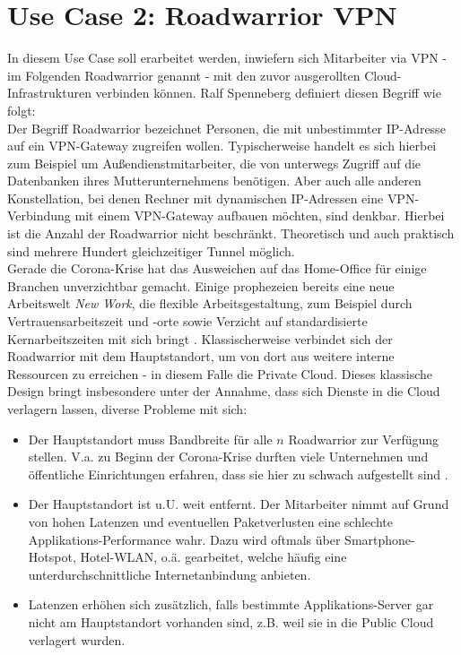 \section{Use Case 2: Roadwarrior VPN}
In diesem Use Case soll erarbeitet werden, inwiefern sich Mitarbeiter via \gls{VPN} - im Folgenden \gls{Roadwarrior} genannt - mit den zuvor ausgerollten Cloud-Infrastrukturen verbinden können. Ralf Spenneberg definiert diesen Begriff wie folgt:\\
\glqq Der Begriff \gls{Roadwarrior} bezeichnet Personen, die mit unbestimmter IP-Adresse auf ein \gls{VPN-Gateway} zugreifen wollen. Typischerweise handelt es sich hierbei zum Beispiel um Außendienstmitarbeiter, die von unterwegs Zugriff auf die Datenbanken ihres Mutterunternehmens benötigen. Aber auch alle anderen Konstellation, bei denen Rechner mit dynamischen IP-Adressen eine \gls{VPN}-Verbindung mit einem \gls{VPN-Gateway} aufbauen möchten, sind denkbar. Hierbei ist die Anzahl der \gls{Roadwarrior} nicht beschränkt. Theoretisch und auch praktisch sind mehrere Hundert gleichzeitiger Tunnel möglich.\grqq{} \cite[S. 199]{Spenneberg2010}\\
Gerade die Corona-Krise hat das Ausweichen auf das Home-Office für einige Branchen unverzichtbar gemacht. Einige prophezeien bereits eine neue Arbeitswelt \textit{New Work}, die \glqq flexible Arbeitsgestaltung, zum Beispiel durch Vertrauensarbeitszeit und -orte sowie Verzicht auf standardisierte Kernarbeitszeiten\grqq{} mit sich bringt \cite{Umbs2020}.
Klassischerweise verbindet sich der \gls{Roadwarrior} mit dem Hauptstandort, um von dort aus weitere interne Ressourcen zu erreichen - in diesem Falle die Private Cloud. Dieses klassische Design bringt insbesondere unter der Annahme, dass sich Dienste in die Cloud verlagern lassen, diverse Probleme mit sich:
\begin{itemize}
\item Der Hauptstandort muss Bandbreite für alle $n$ \gls{Roadwarrior} zur Verfügung stellen. V.a. zu Beginn der Corona-Krise durften viele Unternehmen und öffentliche Einrichtungen erfahren, dass sie hier zu schwach aufgestellt sind \cite{tufreiberg2021}.
\item Der Hauptstandort ist u.U. weit entfernt. Der Mitarbeiter nimmt auf Grund von hohen Latenzen und eventuellen Paketverlusten eine schlechte Applikations-Performance wahr. Dazu wird oftmals über Smartphone-Hotspot, Hotel-WLAN, o.ä. gearbeitet, welche häufig eine unterdurchschnittliche Internetanbindung anbieten.
\item Latenzen erhöhen sich zusätzlich, falls bestimmte Applikations-Server gar nicht am Hauptstandort vorhanden sind, z.B. weil sie in die Public Cloud verlagert wurden.
\end{itemize}

